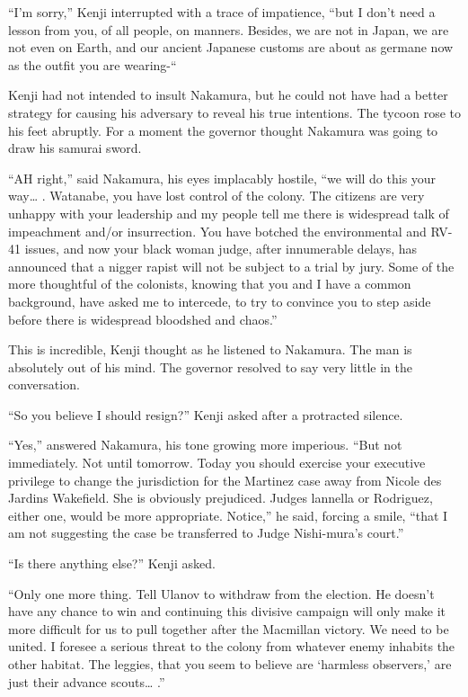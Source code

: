 \documentclass[]{article}
\begin{document}
{“I’m sorry,” Kenji interrupted with a trace of impatience, “but I don’t need a lesson from you, of all people, on manners. Besides, we are not in Japan, we are not even on Earth, and our ancient Japanese customs are about as germane now as the outfit you are wearing-“

Kenji had not intended to insult Nakamura, but he could not have had a better strategy for causing his adversary to reveal his true intentions. The tycoon rose to his feet abruptly. For a moment the governor thought Nakamura was going to draw his samurai sword.

“AH right,” said Nakamura, his eyes implacably hostile, “we will do this your way… . Watanabe, you have lost control of the colony. The citizens are very unhappy with your leadership and my people tell me there is widespread talk of impeachment and/or insurrection. You have botched the environmental and RV-41 issues, and now your black woman judge, after innumerable delays, has announced that a nigger rapist will not be subject to a trial by jury. Some of the more thoughtful of the colonists, knowing that you and I have a common background, have asked me to intercede, to try to convince you to step aside before there is widespread bloodshed and chaos.”

This is incredible, Kenji thought as he listened to Nakamura. The man is absolutely out of his mind. The governor resolved to say very little in the conversation.

“So you believe I should resign?” Kenji asked after a protracted silence.

“Yes,” answered Nakamura, his tone growing more imperious. “But not immediately. Not until tomorrow. Today you should exercise your executive privilege to change the jurisdiction for the Martinez case away from Nicole des Jardins Wakefield. She is obviously prejudiced. Judges lannella or Rodriguez, either one, would be more appropriate. Notice,” he said, forcing a smile, “that I am not suggesting the case be transferred to Judge Nishi-mura’s court.”

“Is there anything else?” Kenji asked.

“Only one more thing. Tell Ulanov to withdraw from the election. He doesn’t have any chance to win and continuing this divisive campaign will only make it more difficult for us to pull together after the Macmillan victory. We need to be united. I foresee a serious threat to the colony from whatever enemy inhabits the other habitat. The leggies, that you seem to believe are ‘harmless observers,’ are just their advance scouts… .”

}
\end{document}
